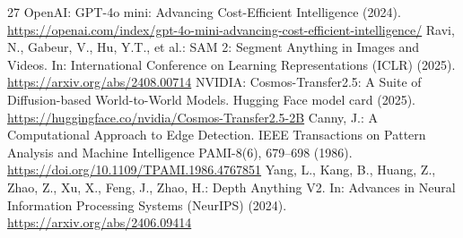 \documentclass[runningheads]{llncs}
\begin{document}
\begin{thebibliography}{27}
 OpenAI: GPT-4o mini: Advancing Cost-Efficient Intelligence (2024). \url{https://openai.com/index/gpt-4o-mini-advancing-cost-efficient-intelligence/}
 Ravi, N., Gabeur, V., Hu, Y.T., et al.: SAM 2: Segment Anything in Images and Videos. In: International Conference on Learning Representations (ICLR) (2025). \url{https://arxiv.org/abs/2408.00714}
 NVIDIA: Cosmos-Transfer2.5: A Suite of Diffusion-based World-to-World Models. Hugging Face model card (2025). \url{https://huggingface.co/nvidia/Cosmos-Transfer2.5-2B}
 Canny, J.: A Computational Approach to Edge Detection. IEEE Transactions on Pattern Analysis and Machine Intelligence PAMI-8(6), 679--698 (1986). \url{https://doi.org/10.1109/TPAMI.1986.4767851}
 Yang, L., Kang, B., Huang, Z., Zhao, Z., Xu, X., Feng, J., Zhao, H.: Depth Anything V2. In: Advances in Neural Information Processing Systems (NeurIPS) (2024). \url{https://arxiv.org/abs/2406.09414}
\end{thebibliography}
\end{document}
